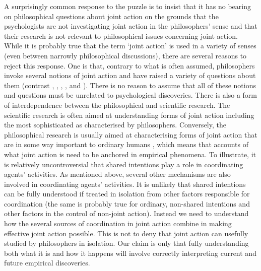 \documentclass[12pt,a4paper]{extarticle}
\begin{document}

A surprisingly common response to the puzzle is to insist that it has no bearing on philosophical questions about joint action   on the grounds that the psychologists are not investigating joint action in the philosophers' sense and that their research is not relevant to philosophical issues concerning joint action.  
While it is probably true that the term `joint action' is used in a variety of senses (even between narrowly philosophical discussions), there are several reasons to reject this response.  
One is that, contrary to what is often assumed, philosophers invoke several notions of joint action and have raised a variety of questions about them (contrast
	\citealp{Bratman:2009lv},
	\citealp{Gold:2007zd},
	\citealp{miller_social_2001},
	\citealp{Pacherie:2010fk},
	and \citealp{tuomela_we-intentions_2005}%
%	
).  
There is no reason to assume that all of these notions and questions must be unrelated to  psychological discoveries.
There is also a form of interdependence between the philosophical and scientific research.
The scientific research is often aimed at understanding forms of joint action including the most sophisticated as characterised by philosophers.  
Conversely, the philosophical research is usually aimed at characterising forms of joint action that are in some way important to ordinary humans \citep[e.g.][p.\ 327]{Bratman:1992mi}, which means that accounts of what joint action is need to be anchored in empirical phenomena.
To illustrate, it is relatively uncontroversial that shared intentions play a role in coordinating agents' activities.  
As mentioned above, several other mechanisms are also involved in coordinating agents' activities.  
It is unlikely that shared intentions can be fully understood if  treated in isolation from other factors responsible for coordination (the same is probably true for ordinary, non-shared intentions and other factors in the control of non-joint action).  
Instead we need to understand how the several sources of coordination in joint action combine in making effective joint action possible.
This is not to deny that joint action can usefully studied by philosophers in isolation.  Our claim is only that fully understanding both what it is and how it happens will involve correctly interpreting current and future empirical discoveries.
\end{document}
